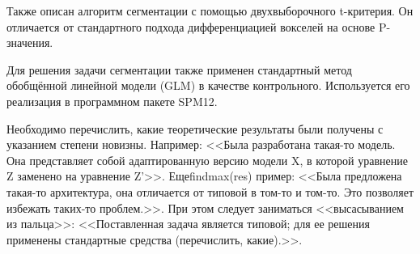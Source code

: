 Также описан алгоритм сегментации с помощью двухвыборочного t-критерия. Он отличается от стандартного подхода дифференциацией вокселей на основе P-значения.

Для решения задачи сегментации также применен стандартный метод обобщённой линейной модели (GLM) в качестве контрольного. Используется его реализация в программном пакете SPM12.

Необходимо перечислить, какие теоретические результаты были получены с указанием степени новизны. Например: <<Была разработана такая-то модель. Она представляет собой адаптированную версию модели X, в которой уравнение Z заменено на уравнение Z'>>. Ещеfindmax(res) пример: <<Была предложена такая-то архитектура, она отличается от типовой в том-то и том-то. Это позволяет избежать таких-то проблем.>>. При этом следует заниматься <<высасыванием из пальца>>: <<Поставленная задача является типовой; для ее решения применены стандартные средства (перечислить, какие).>>.